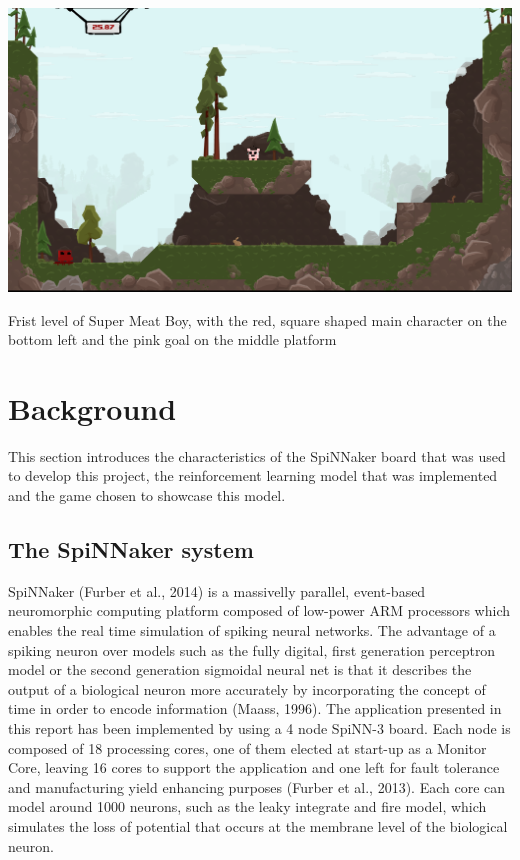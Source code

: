 \documentclass[10pt]{article}
\begin{document}
    \begin{suppfigure*}[b]
    \center
    \includegraphics[width=160mm]{./level1.png}
    \caption{Frist level of Super Meat Boy, with the red, square shaped main character on the bottom left and the pink goal on the middle platform}
    \label{fig:firstLevel}
    \end{suppfigure*}

    \section{Background}

    This section introduces the characteristics of the SpiNNaker board that was used to develop this project, the reinforcement learning model that was implemented and the game chosen to showcase this model.

    \subsection{The SpiNNaker system}

    SpiNNaker (Furber et al., 2014) is a massivelly parallel, event-based neuromorphic computing platform composed of low-power ARM processors which enables the real time simulation of spiking neural networks. The advantage of a spiking neuron over models such as the fully digital, first generation perceptron model or the second generation sigmoidal neural net is that it describes the output of a biological neuron more accurately by incorporating the concept of time in order to encode information (Maass, 1996). The application presented in this report has been implemented by using a 4 node SpiNN-3 board. Each node is composed of 18 processing cores, one of them elected at start-up as a Monitor Core, leaving 16 cores to support the application and one left for fault tolerance and manufacturing yield enhancing purposes (Furber et al., 2013). Each core can model around 1000 neurons, such as the leaky integrate and fire model, which simulates the loss of potential that occurs at the membrane level of the biological neuron.
\end{document}
